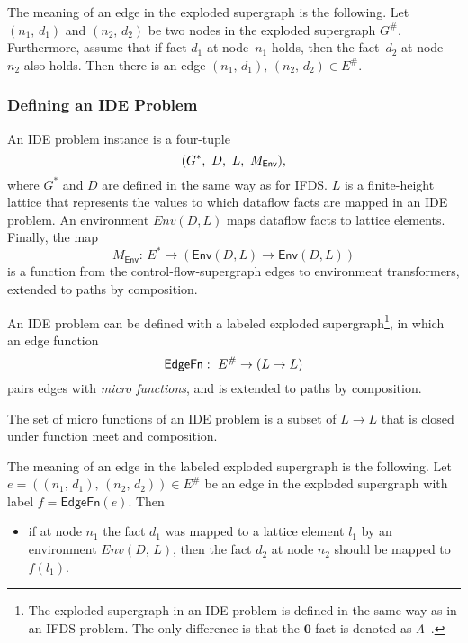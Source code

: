 The meaning of an edge in the exploded supergraph is the following.
Let $(n_1,\,d_1)$ and $(n_2,\,d_2)$ be two nodes in the exploded supergraph $G^\#$. Furthermore, assume that if fact $d_1$ at node~$n_1$ holds, then the fact~$d_2$ at node~$n_2$ also holds. Then there is an edge $(n_1,\,d_1),\,(n_2,\,d_2)\in E^\#$.

\subsubsection{Defining an IDE Problem}\label{sec:defide}
An IDE problem instance is a four-tuple
\[
    (G^*,\ D,\ L,\ M_\textsf{Env}),
\]
where $G^*$ and $D$ are defined in the same way as for IFDS. $L$ is a finite-height lattice that represents the values to which dataflow facts are mapped in an IDE problem. An environment $Env(D, L)$ maps dataflow facts to lattice elements. Finally, the map $$M_{\textsf{Env}}:\,E^*\to(\textsf{Env}(D, L)\to \textsf{Env}(D, L))$$ is a function from the control-flow-supergraph edges to environment transformers, extended to paths by composition.

An IDE problem can be defined with a labeled exploded supergraph\footnote{
    The exploded supergraph in an IDE problem is defined in the same way as in an IFDS problem. The only difference is that the $\mathbf0$ fact is denoted as $\Lambda$~\cite{reps1995precise,sagiv1996precise}.
}, in which an edge function
\begin{equation}
  \textsf{EdgeFn}:\ E^\#\to(L\to L)
\end{equation}
pairs edges with \textit{micro functions}, and is extended to paths by composition.

The set of micro functions of an IDE problem is a subset of $L\to L$ that is closed under function meet and composition.

The meaning of an edge in the labeled exploded supergraph is the following. Let $e=((n_1,\,d_1),\,(n_2,\,d_2))\in E^\#$ be an edge in the exploded supergraph with label $f=\mathsf{EdgeFn}(e)$. Then
\begin{itemize}
  \item if at node $n_1$ the fact $d_1$ was mapped to a lattice element $l_1$ by an environment $Env(D,\,L)$, then the fact $d_2$ at node $n_2$ should be mapped to $f(l_1)$.
\end{itemize}


